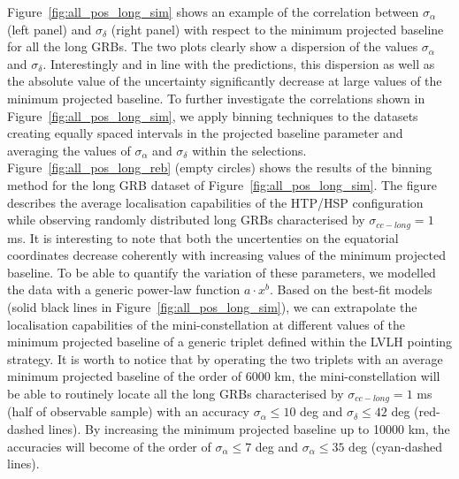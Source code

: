 \documentclass[]{spie}  %
\begin{document}
Figure~\ref{fig:all_pos_long_sim} shows an example of the correlation between $\sigma_\alpha$ (left panel) and $\sigma_\delta$ (right panel) with respect to the minimum projected baseline for all the long GRBs. The two plots clearly show a dispersion of the values $\sigma_\alpha$ and $\sigma_\delta$. Interestingly and in line with the predictions, this dispersion as well as the absolute value of the uncertainty significantly decrease at large values of the minimum projected baseline. To further investigate the correlations shown in Figure~\ref{fig:all_pos_long_sim}, we apply binning techniques to the datasets creating equally spaced intervals in the projected baseline parameter and averaging the values of $\sigma_\alpha$ and $\sigma_\delta$ within the selections. Figure~\ref{fig:all_pos_long_reb} (empty circles) shows the results of the binning method for the long GRB dataset of Figure~\ref{fig:all_pos_long_sim}. The figure describes the average localisation capabilities of the HTP/HSP configuration while observing randomly distributed long GRBs characterised by $σ_{cc-long} = 1$ ms. It is interesting to note that both the uncertenties on the equatorial coordinates decrease coherently with increasing values of the minimum projected baseline. To be able to quantify the variation of these parameters, we modelled the data with a generic power-law function $a\cdot x^b$. Based on the best-fit models (solid black lines in Figure~\ref{fig:all_pos_long_sim}), we can extrapolate the localisation capabilities of the mini-constellation at different values of the minimum projected baseline of a generic triplet defined within the LVLH pointing strategy. It is worth to notice that by operating the two triplets with an average minimum projected baseline of the order of 6000 km, the mini-constellation will be able to routinely locate all the long GRBs characterised by $σ_{cc-long} = 1$ ms (half of observable sample) with an accuracy $\sigma_\alpha \leq 10$ deg and $\sigma_\delta \leq 42$ deg (red-dashed lines). By increasing the minimum projected baseline up to 10000 km, the accuracies will become of the order of $\sigma_\alpha \leq 7$ deg and $\sigma_\alpha \leq 35$ deg (cyan-dashed lines). 
\end{document}
